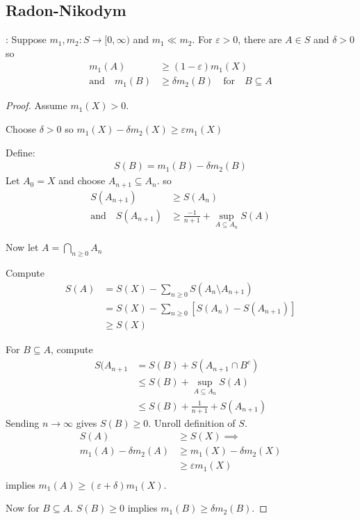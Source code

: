 \subsection{Radon-Nikodym}

\begin{lemma}: Suppose $m_1, m_2 : S \to [0, \infty)$ and $m_1 \ll m_2$.
For $\varepsilon > 0$, there are $A \in S$ and $\delta > 0$ so
\begin{align*}
			m_1 (A) &\geq (1 - \varepsilon) m_1 (X) \\
	\text{and} \quad m_1 (B) &\geq \delta m_2 (B) \quad \text{for} \quad B \subseteq A
\end{align*}
\end{lemma}


\begin{proof}
	Assume $m_1 (X) > 0$.

	Choose $\delta > 0$ so $m_1 (X) - \delta m_2 (X) \geq \varepsilon m_1 (X)$

	Define:
	\begin{align*}
		S (B) = m_1 (B) - \delta m_2 (B)
	\end{align*}
	Let $A_0 = X$ and choose  $A_{n+1} \subseteq A_{n}$. so
	\begin{align*}
		S( A_{n + 1} ) &\geq S (A_{n}) \\
		\text{and} \quad S(A_{n+1} ) &\geq \frac{-1}{n+1} + \sup_{A \subseteq A_{n}	} S (A)
	\end{align*}

	Now let $A = \bigcap_{n \geq 0} A_n$

	Compute
	\begin{align*}
		S(A) &= S(X) - \sum_{n \geq 0} S( A_n \setminus A_{n+1} ) \\
			 &= S(X) - \sum_{n \geq 0} [S(A_{n}) - S(A_{n+1} ) ] \\
			 &\geq S(X)
	\end{align*}

	For $B \subseteq A$, compute
	\begin{align*}
		S(A_{n + 1} &= S(B) + S(A_{n+1} \cap B^c ) \\
					&\leq S(B) + \sup_{A \subseteq A_{n}} S(A) \\
					&\leq S(B) + \frac{1}{n+1} + S(A_{n+1} )
	\end{align*} Sending $n \to \infty$ gives $S(B) \geq 0$. Unroll definition of $S$.
	\begin{align*}
		S(A) &\geq S(X) \implies \\
		m_1 (A) - \delta m_2 (A) &\geq m_1 (X) - \delta m_2 (X) \\
								 &\geq \varepsilon m_1 (X) \\
	\end{align*} implies $m_1 (A) \geq ( \varepsilon + \delta) m_1 (X)$.

	Now for $B \subseteq A$. $S(B) \geq 0$ implies $m_1 (B) \geq \delta m_2 (B)$.
\end{proof}


